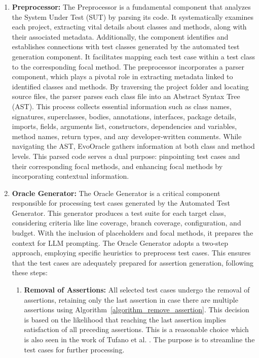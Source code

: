 \begin{enumerate}
    \item \textbf{Preprocessor:} The Preprocessor is a fundamental component that analyzes the System Under Test (SUT) by parsing its code. It systematically examines each project, extracting vital details about classes and methods, along with their associated metadata. Additionally, the component identifies and establishes connections with test classes generated by the automated test generation component. It facilitates mapping each test case within a test class to the corresponding focal method. The preprocessor incorporates a parser component, which plays a pivotal role in extracting metadata linked to identified classes and methods. By traversing the project folder and locating source files, the parser parses each class file into an Abstract Syntax Tree (AST). This process collects essential information such as class names, signatures, superclasses, bodies, annotations, interfaces, package details, imports, fields, arguments list, constructors, dependencies and variables, method names, return types, and any developer-written comments. While navigating the AST, EvoOracle gathers information at both class and method levels. This parsed code serves a dual purpose: pinpointing test cases and their corresponding focal methods, and enhancing focal methods by incorporating contextual information.
    
    \item \textbf{Oracle Generator:} The Oracle Generator is a critical component responsible for processing test cases generated by the Automated Test Generator. This generator produces a test suite for each target class, considering criteria like line coverage, branch coverage, configuration, and budget. With the inclusion of placeholders and focal methods, it prepares the context for LLM prompting. The Oracle Generator adopts a two-step approach, employing specific heuristics to preprocess test cases. This ensures that the test cases are adequately prepared for assertion generation, following these steps:

    \begin{enumerate}
        \item \textbf{Removal of Assertions:} All selected test cases undergo the removal of assertions, retaining only the last assertion in case there are multiple assertions using Algorithm~\ref{algorithm_remove_assertion}. This decision is based on the likelihood that reaching the last assertion implies satisfaction of all preceding assertions. This is a reasonable choice which is also seen in the work of Tufano et al. \cite{tufano_generating_2022}. The purpose is to streamline the test cases for further processing.


\end{enumerate}
\end{enumerate}
